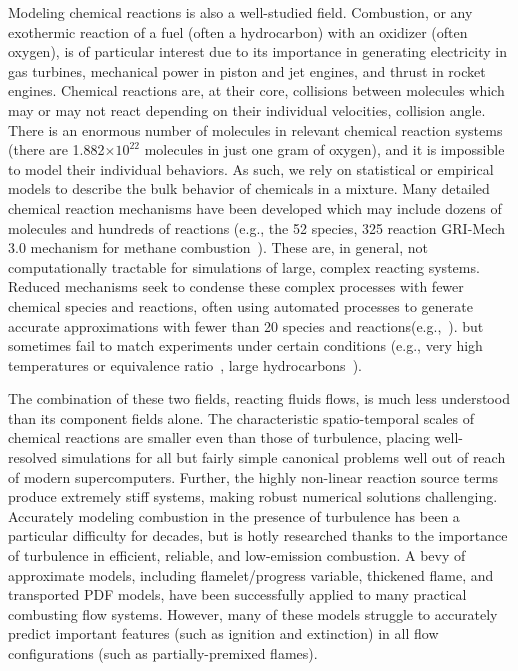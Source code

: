 Modeling chemical reactions is also a well-studied field. Combustion, or any exothermic reaction of a fuel (often a hydrocarbon) with an oxidizer (often oxygen), is of particular interest due to its importance in generating electricity in gas turbines, mechanical power in piston and jet engines, and thrust in rocket engines. Chemical reactions are, at their core, collisions between molecules which may or may not react depending on their individual velocities, collision angle. There is an enormous number of molecules in relevant chemical reaction systems (there are 1.882$\times 10^{22}$ molecules in just one gram of oxygen), and it is impossible to model their individual behaviors. As such, we rely on statistical or empirical models to describe the bulk behavior of chemicals in a mixture. Many detailed chemical reaction mechanisms have been developed which may include dozens of molecules and hundreds of reactions (e.g., the 52 species, 325 reaction GRI-Mech 3.0 mechanism for methane combustion~\cite{griMech}). These are, in general, not computationally tractable for simulations of large, complex reacting systems. Reduced mechanisms seek to condense these complex processes with fewer chemical species and reactions, often using automated processes to generate accurate approximations with fewer than 20 species and reactions(e.g.,~\cite{Sung1998}). but sometimes fail to match experiments under certain conditions (e.g., very high temperatures or equivalence ratio~\cite{Westbrook1984}, large hydrocarbons~\cite{Lu2008}).

The combination of these two fields, reacting fluids flows, is much less understood than its component fields alone. The characteristic spatio-temporal scales of chemical reactions are smaller even than those of turbulence, placing well-resolved simulations for all but fairly simple canonical problems well out of reach of modern supercomputers. Further, the highly non-linear reaction source terms produce extremely stiff systems, making robust numerical solutions challenging. Accurately modeling combustion in the presence of turbulence has been a particular difficulty for decades, but is hotly researched thanks to the importance of turbulence in efficient, reliable, and low-emission combustion. A bevy of approximate models, including flamelet/progress variable, thickened flame, and transported PDF models, have been successfully applied to many practical combusting flow systems. However, many of these models struggle to accurately predict important features (such as ignition and extinction) in all flow configurations (such as partially-premixed flames).

